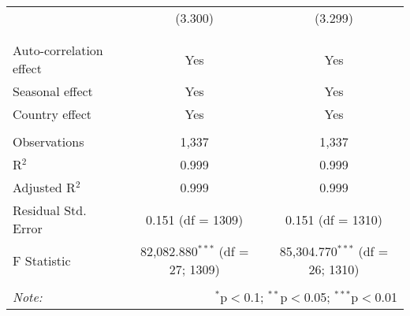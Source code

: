 \begin{table}[!htbp]
\begin{tabular}{@{\extracolsep{5pt}}lcc}
  & (3.300) & (3.299) \\ 
  & & \\ 
\hline \\[-1.8ex] 
Auto-correlation effect & Yes & Yes \\ 
Seasonal effect & Yes & Yes \\ 
Country effect & Yes & Yes \\ 
\hline \\[-1.8ex] 
Observations & 1,337 & 1,337 \\ 
R$^{2}$ & 0.999 & 0.999 \\ 
Adjusted R$^{2}$ & 0.999 & 0.999 \\ 
Residual Std. Error & 0.151 (df = 1309) & 0.151 (df = 1310) \\ 
F Statistic & 82,082.880$^{***}$ (df = 27; 1309) & 85,304.770$^{***}$ (df = 26; 1310) \\ 
\hline 
\hline \\[-1.8ex] 
\textit{Note:}  & \multicolumn{2}{r}{$^{*}$p$<$0.1; $^{**}$p$<$0.05; $^{***}$p$<$0.01} \\ 
\end{tabular} 
\end{table} 
